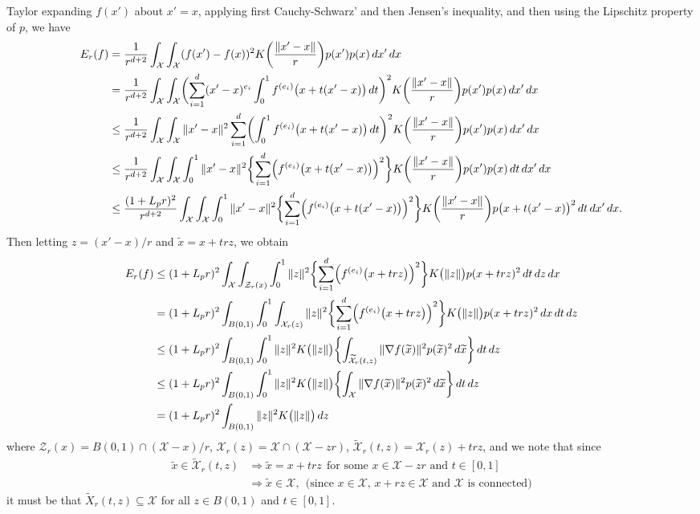 \documentclass{article}
\newcommand{\1}{\mathbf{1}}
\newcommand{\Xset}{\mathcal{X}}
\newcommand{\wt}[1]{\widetilde{#1}}
\theoremstyle{alden}
\theoremstyle{aldenthm}
\theoremstyle{definition}
\theoremstyle{remark}
\begin{document}
Taylor expanding $f(x')$ about $x' = x$, applying first Cauchy-Schwarz' and then Jensen's inequality, and then using the Lipschitz property of $p$, we have
\begin{align*}
E_r(f) & = \frac{1}{r^{d + 2}}\int_{\Xset} \int_{\Xset} (f(x') - f(x))^2 K\biggl(\frac{\|x' - x\|}{r}\biggr) p(x') p(x) \,dx' \,dx \\
& = \frac{1}{r^{d + 2}}\int_{\Xset} \int_{\Xset} \biggl(\sum_{i = 1}^{d} (x' - x)^{e_i} \int_0^1 f^{(e_i)}\bigl(x + t(x' - x)\bigr) \,dt\biggr)^2 K\biggl(\frac{\|x' - x\|}{r}\biggr) p(x') p(x) \,dx' \,dx \\
& \leq \frac{1}{r^{d + 2}}\int_{\Xset} \int_{\Xset} \|x' - x\|^2 \sum_{i = 1}^{d}\biggl(\int_0^1 f^{(e_i)}\bigl(x + t(x' - x)\bigr) \,dt\biggr)^2 K\biggl(\frac{\|x' - x\|}{r}\biggr) p(x') p(x) \,dx' \,dx \\
& \leq \frac{1}{r^{d + 2}}\int_{\Xset} \int_{\Xset} \int_0^1   \|x' - x\|^2 \biggl\{\sum_{i = 1}^{d} \Bigl(f^{(e_i)}\bigl(x + t(x' - x)\bigr)\Bigr)^2\biggr\} K\biggl(\frac{\|x' - x\|}{r}\biggr) p(x') p(x)   \,dt   \,dx' \,dx \\
& \leq \frac{(1 + L_pr)^2}{r^{d + 2}}\int_{\Xset} \int_{\Xset} \int_0^1  \|x' - x\|^2 \biggl\{\sum_{i = 1}^{d} \Bigl(f^{(e_i)}\bigl(x + t(x' - x)\bigr)\Bigr)^2\biggr\} K\biggl(\frac{\|x' - x\|}{r}\biggr) p\bigl(x + t(x' - x)\bigr)^2   \,dt   \,dx' \,dx.
\end{align*} 
Then letting $z = (x' - x)/r$ and $\wt{x} = x + trz$, we obtain
\begin{align*}
E_r(f) & \leq (1 + L_pr)^2 \int_{\Xset} \int_{\mathcal{Z}_r(x)} \int_{0}^{1} \|z\|^2 \biggl\{\sum_{i = 1}^{d} \Bigl(f^{(e_i)}\bigl(x + trz\bigr)\Bigr)^2\biggr\} K\bigl(\|z\|\bigr) p(x + trz)^2 \,dt \,dz \,dx \\
& = (1 + L_pr)^2 \int_{B(0,1)} \int_{0}^{1}  \int_{\Xset_r(z)} \|z\|^2 \biggl\{\sum_{i = 1}^{d} \Bigl(f^{(e_i)}\bigl(x + trz\bigr)\Bigr)^2\biggr\} K\bigl(\|z\|\bigr) p(x + trz)^2 \,dx \,dt \,dz \\
& \leq (1 + L_pr)^2 \int_{B(0,1)} \int_{0}^{1} \|z\|^2 K\bigl(\|z\|\bigr) \biggl\{\int_{\wt{\Xset}_r(t,z)} \|\nabla f(\wt{x})\|^2 p(\wt{x})^2 \,d\wt{x}\biggr\} \,dt \,dz  \\
& \leq (1 + L_pr)^2 \int_{B(0,1)} \int_{0}^{1} \|z\|^2 K\bigl(\|z\|\bigr) \biggl\{\int_{\Xset} \|\nabla f(\wt{x})\|^2 p(\wt{x})^2 \,d\wt{x}\biggr\} \,dt \,dz \\
& = (1 + L_pr)^2 \int_{B(0,1)} \|z\|^2 K\bigl(\|z\|\bigr) \,dz 
\end{align*}
where $\mathcal{Z}_r(x) = B(0,1) \cap (\Xset - x)/r$, $\Xset_r(z) = \Xset \cap( \Xset - zr)$, $\wt{\Xset}_r(t,z) = \Xset_r(z) + trz$, and we note that since
\begin{align*}
\wt{x} \in \wt{\Xset}_r(t,z) & \Longrightarrow \wt{x} = x + trz ~~ \textrm{for some $x \in \Xset - zr$ and $t \in [0,1]$} \\
& \Longrightarrow \wt{x} \in \Xset,~~ \textrm{(since $x \in \Xset$, $x + rz \in \Xset$ and $\Xset$ is connected)}
\end{align*}
it must be that $\wt{X}_r(t,z) \subseteq \Xset$ for all $z \in B(0,1)$ and $t \in [0,1]$. 
\end{document}

